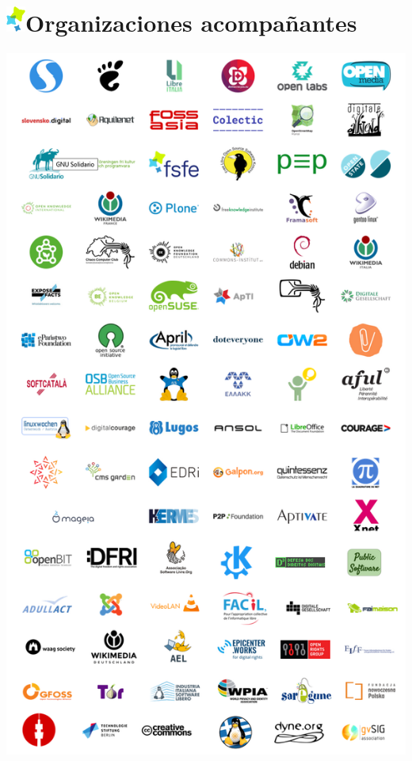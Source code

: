 \documentclass[10pt,foldmark,tumble]{leaflet}
\begin{document}
\section{\includegraphics{item.png}Organizaciones acompañantes}
\vspace{1em}
\includegraphics[scale=0.40]{colab.png} 


\end{document}
